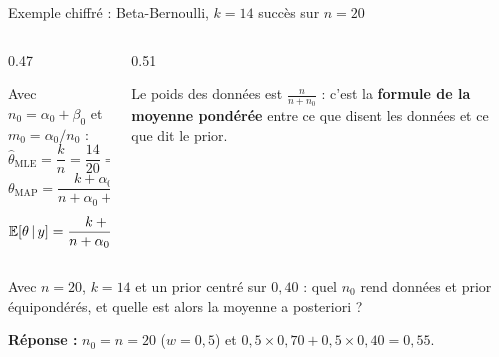 \begin{frame}{Exemple chiffré : Beta-Bernoulli, $k = 14$ succès sur $n = 20$}
\begin{columns}[t]
\begin{column}{0.47\textwidth}
\begin{ebox}
\small
Avec $n_0 = \alpha_0 + \beta_0$ et $m_0 = \alpha_0/n_0$ :
\[
\hat\theta_{\text{MLE}} = \frac{k}{n} = \frac{14}{20} = 0{,}700
\]
\[
\theta_{\text{MAP}} = \frac{k + \alpha_0 - 1}{n + \alpha_0 + \beta_0 - 2}
\]
\[
\mathbb{E}[\theta \,\vert\, y] = \frac{k + \alpha_0}{n + \alpha_0 + \beta_0}
= \frac{k + n_0 m_0}{n + n_0}
\]
\end{ebox}
\end{column}
\begin{column}{0.51\textwidth}
\begin{solbox}
\vspace{1.5mm}

\small Le poids des données est $\frac{n}{n+n_0}$ : c'est la \textbf{formule de la
moyenne pondérée} entre ce que disent les données et ce que dit le prior.
\end{solbox}
\end{column}
\end{columns}
\vspace{1mm}
\begin{abox}
Avec $n = 20$, $k = 14$ et un prior centré sur $0{,}40$ : quel $n_0$ rend données
et prior équipondérés, et quelle est alors la moyenne a posteriori ?
\vspace{0.5mm}

\textbf{Réponse :} $n_0 = n = 20$ ($w = 0{,}5$) et
$0{,}5 \times 0{,}70 + 0{,}5 \times 0{,}40 = 0{,}55$.
\end{abox}
\end{frame}

